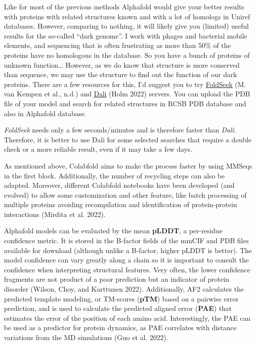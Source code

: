 \documentclass[
]{scrbook}
\begin{document}
Like for most of the previous methods Alphafold would give your better
results with proteins with related structures known and with a lot of
homologs in Uniref databases. However, comparing to nothing, it will
likely give you (limited) useful results for the so-called ``dark
genome''. I work with phages and bacterial mobile elements, and
sequencing that is often frustrating as more than 50\% of the proteins
have no homologous in the database. So you have a bunch of proteins of
unknown function\ldots{} However, as we do know that structure is more
conserved than sequence, we may use the structure to find out the
function of our dark proteins. There are a few resources for this, I'd
suggest you to try \href{https://search.foldseek.com/search}{FoldSeek}
(M. van Kempen et al., n.d.) and
\href{http://ekhidna2.biocenter.helsinki.fi/dali/}{Dali} (Holm 2022)
servers. You can upload the PDB file of your model and search for
related structures in RCSB PDB database and also in Alphafold database.

\begin{tcolorbox}[enhanced jigsaw, toptitle=1mm, colbacktitle=quarto-callout-tip-color!10!white, breakable, opacityback=0, coltitle=black, arc=.35mm, colback=white, leftrule=.75mm, titlerule=0mm, colframe=quarto-callout-tip-color-frame, opacitybacktitle=0.6, bottomtitle=1mm, title=\textcolor{quarto-callout-tip-color}{\faLightbulb}\hspace{0.5em}{Tip}, bottomrule=.15mm, toprule=.15mm, left=2mm, rightrule=.15mm]

\emph{FoldSeek} needs only a few seconds/minutes and is therefore faster
than \emph{Dali}. Therefore, it is better to use Dali for some selected
searches that require a double check or a more reliable result, even if
it may take a few days.

\end{tcolorbox}

As mentioned above, Colabfold aims to make the process faster by using
MMSeqs in the first block. Additionally, the number of recycling steps
can also be adapted. Moreover, different Colabfold notebooks have been
developed (and evolved) to allow some customization and other feature,
like batch processing of multiple proteins avoiding recompilation and
identification of protein-protein interactions (Mirdita et al. 2022).

Alphafold models can be evaluated by the mean \textbf{pLDDT}, a
per-residue confidence metric. It is stored in the B-factor fields of
the mmCIF and PDB files available for download (although unlike a
B-factor, higher pLDDT is better). The model confidence can vary greatly
along a chain so it is important to consult the confidence when
interpreting structural features. Very often, the lower confidence
fragments are not product of a poor prediction but an indicator of
protein disorder (Wilson, Choy, and Karttunen 2022). Additionally, AF2
calculates the predicted template modeling, or TM-scores (\textbf{pTM})
based on a pairwise error prediction, and is used to calculate the
predicted aligned error (\textbf{PAE}) that estimates the error of the
position of each amino acid. Interestingly, the PAE can be used as a
predictor for protein dynamics, as PAE correlates with distance
variations from the MD simulations (Guo et al. 2022).
\end{document}
